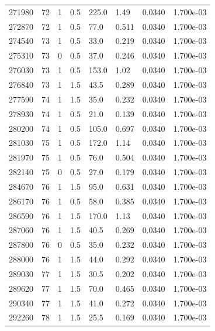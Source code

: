 \documentclass[preview]{standalone}
\begin{document}
{{{{{{{{{\begin{tabular}{L{1.2cm}C{1.2cm} C{0.3cm}C{0.5cm} C{1.4cm}C{1.4cm} C{1.4cm}C{1.4cm}}
  271980  &    72  & 1     & 0.5 &  225.0  & 1.49  & 0.0340 &  1.700e-03   \\ 
  272870  &    72  & 1     & 0.5 &  77.0  & 0.511  & 0.0340 &  1.700e-03   \\ 
  274540  &    73  & 1     & 0.5 &  33.0  & 0.219  & 0.0340 &  1.700e-03   \\ 
  275310  &    73  & 0     & 0.5 &  37.0  & 0.246  & 0.0340 &  1.700e-03   \\ 
  276030  &    73  & 1     & 0.5 &  153.0  & 1.02  & 0.0340 &  1.700e-03   \\ 
  276840  &    73  & 1     & 1.5 &  43.5  & 0.289  & 0.0340 &  1.700e-03   \\ 
  277590  &    74  & 1     & 1.5 &  35.0  & 0.232  & 0.0340 &  1.700e-03   \\ 
  278930  &    74  & 1     & 0.5 &  21.0  & 0.139  & 0.0340 &  1.700e-03   \\ 
  280200  &    74  & 1     & 0.5 &  105.0  & 0.697  & 0.0340 &  1.700e-03   \\ 
  281030  &    75  & 1     & 0.5 &  172.0  & 1.14  & 0.0340 &  1.700e-03   \\ 
  281970  &    75  & 1     & 0.5 &  76.0  & 0.504  & 0.0340 &  1.700e-03   \\ 
  282140  &    75  & 0     & 0.5 &  27.0  & 0.179  & 0.0340 &  1.700e-03   \\ 
  284670  &    76  & 1     & 1.5 &  95.0  & 0.631  & 0.0340 &  1.700e-03   \\ 
  286170  &    76  & 1     & 0.5 &  58.0  & 0.385  & 0.0340 &  1.700e-03   \\ 
  286590  &    76  & 1     & 1.5 &  170.0  & 1.13  & 0.0340 &  1.700e-03   \\ 
  287060  &    76  & 1     & 1.5 &  40.5  & 0.269  & 0.0340 &  1.700e-03   \\ 
  287800  &    76  & 0     & 0.5 &  35.0  & 0.232  & 0.0340 &  1.700e-03   \\ 
  288000  &    76  & 1     & 1.5 &  44.0  & 0.292  & 0.0340 &  1.700e-03   \\ 
  289030  &    77  & 1     & 1.5 &  30.5  & 0.202  & 0.0340 &  1.700e-03   \\ 
  289620  &    77  & 1     & 1.5 &  70.0  & 0.465  & 0.0340 &  1.700e-03   \\ 
  290340  &    77  & 1     & 1.5 &  41.0  & 0.272  & 0.0340 &  1.700e-03   \\ 
  292260  &    78  & 1     & 1.5 &  25.5  & 0.169  & 0.0340 &  1.700e-03   \\ 

\end{tabular}}}}}}}}}}
\end{document}

